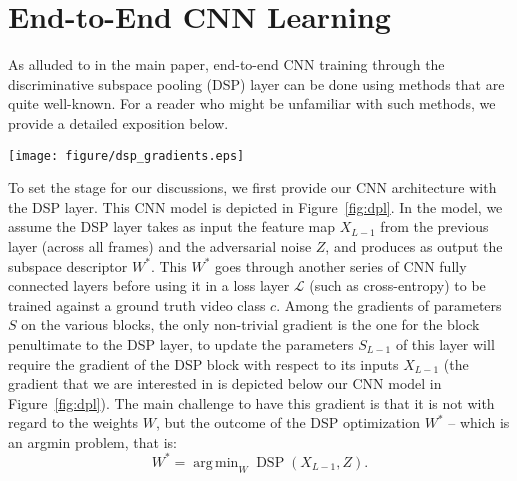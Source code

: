 \documentclass[runningheads]{llncs}
\DeclareMathOperator*{\dsp}{DSP}
\DeclareMathOperator*{\argmin}{arg\,min}
\begin{document}
\section{End-to-End CNN Learning}
\label{sec:end-to-end}
As alluded to in the main paper, end-to-end CNN training through the discriminative subspace pooling (DSP) layer can be done using methods that are quite well-known. For a reader who might be unfamiliar with such methods, we provide a detailed exposition below. 
\begin{figure*}[t]
\centering
\texttt{[image: figure/dsp\_gradients.eps]}
\caption{Architecture of our end-to-end CNN with discriminative subspace pooling (DSP) layer in between. We assume $X_{\ell}$ represents the feature map outputs from the $\ell$-th CNN layer (from all frames in the sequence) denoted as $f_{\ell}$, and $S_{\ell}$ represents its respective parameters. The final loss is shows as $\mathcal{L}$, $\sigma(\beta)$ is the softmax function, and $c$ is the action class label. The parameter $W$ is the subspace pooled output of the DSP layer, and $Z$ is the adversarial noise. Below the model, we provide the gradient that we are after for enabling back-propagation through the DSP layer.} 
\label{fig:dpl}
\end{figure*}
To set the stage for our discussions, we first provide our CNN architecture with the DSP layer. This CNN model is depicted in Figure~\ref{fig:dpl}. In the model, we assume the DSP layer takes as input the feature map $X_{L-1}$ from the previous layer (across all frames) and the adversarial noise $Z$, and produces as output the subspace descriptor $W^*$. This $W^*$ goes through another series of CNN fully connected layers before using it in a loss layer $\mathcal{L}$ (such as cross-entropy) to be trained against a ground truth video class $c$. Among the gradients of parameters $S$ on the various blocks, the only non-trivial gradient is the one for the block penultimate to the DSP layer, to update the parameters $S_{L-1}$ of this layer will require the gradient of the DSP block with respect to its inputs $X_{L-1}$ (the gradient that we are interested in is depicted below our CNN model in Figure~\ref{fig:dpl}). The main challenge to have this gradient is that it is not with regard to the weights $W$, but the outcome of the DSP optimization $W^*$ -- which is an argmin problem, that is:
\begin{equation}
W^* = \argmin_{W} \dsp(X_{L-1}, Z).
\end{equation}
\end{document}

